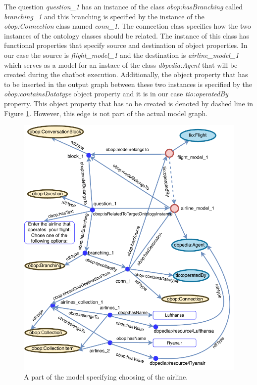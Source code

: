 \documentclass[runningheads]{llncs}
\begin{document}
The question \textit{question\_1} has an instance of the class \textit{obop:hasBranching} called \textit{branching\_1} and this branching is specified by the instance of the \textit{obop:Connection} class named \textit{conn\_1}. The connection class specifies how the two instances of the ontology classes should be related. The instance of this class has functional properties that specify source and destination of object properties. In our case the source is \textit{flight\_model\_1} and the destination is \textit{airline\_model\_1} which serves as a model for an instace of the class \textit{dbpedia:Agent} that will be created during the chatbot execution. Additionally, the object property that has to be inserted in the output graph between these two instances is specified by the \textit{obop:containsDatatype} object property and it is in our case \textit{tio:operatedBy} property. This object property that has to be created is denoted by dashed line in Figure \ref{fig:branching_schema}. However, this edge is not part of the actual model graph.    

\begin{figure}[H]
  \centering
  \includegraphics[width=\linewidth]{img/branching_schema}
  \caption{A part of the model specifying choosing of the airline.}
  \label{fig:branching_schema}
\end{figure}
\end{document}
